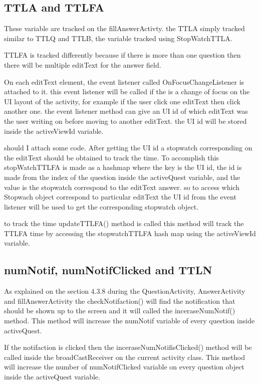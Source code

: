 \subsection{TTLA and TTLFA}
These variable are tracked on the fillAnswerActivty. the TTLA simply tracked similar to TTLQ and TTLB, the variable tracked using StopWatchTTLA.

TTLFA is tracked differently because if there is more than one question then there will be multiple editText for the answer field.

On each editText element, the event listener called OnFocusChangeListener is attached to it. this event listener will be called if the is a
change of focus on the UI layout of the activity, for example if the user click one editText then click another one. the event listener
 method can give an UI id of which editText was the user writing on before moving to another editText. the UI id will be stored inside the activeViewId variable.

{should I attach some code}. After getting the UI id a stopwatch corresponding on the editText should be obtained to track the time.
To accomplish this stopWatchTTLFA is made as a hashmap where the key is the UI id, the id is made from the index of the question inside the activeQuest variable,
and the value is the stopwatch correspond to the editText answer. so to access which Stopwach object correspond to particular editText the UI id from the event listener
will be used to get the corresponding stopwatch object.

to track the time updateTTLFA() method is called this method will track the TTLFA time by accessing the stopwatchTTLFA hash map using the activeViewId variable.


\subsection{numNotif, numNotifClicked and TTLN}
As explained on the section 4.3.8 during the QuestionActivity, AnswerActivity and fillAnswerActivity the checkNotifaction()
will find the notification that should be shown up to the screen and it will called the inceraseNumNotif() method.
This method will increase the numNotif variable of every question inside activeQuest.

If the notifaction is clicked then the inceraseNumNotifisClicked() method will be called inside the broadCastReceiver on the current activity class.
This method will increase the number of numNotifClicked variable on every question object inside the activeQuest variable.

